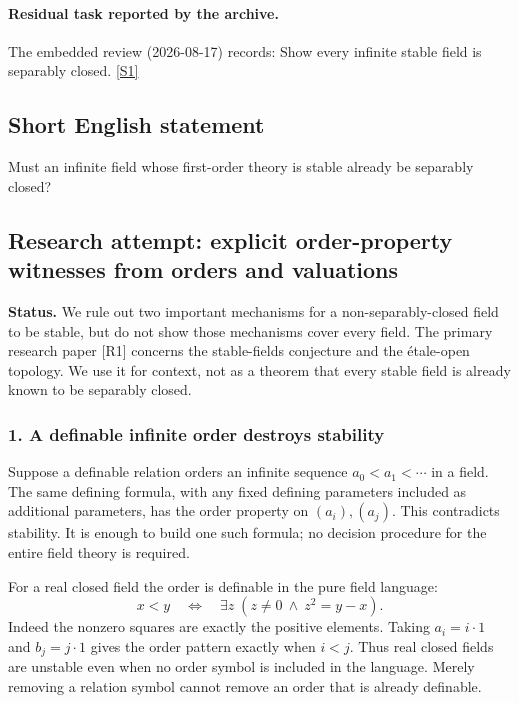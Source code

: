 \documentclass[11pt,a4paper]{article}
\newcommand{\sref}[2]{\hyperlink{source:#1:#2}{[S#2]}}
\begin{document}
\paragraph{Residual task reported by the archive.}

The embedded review (2026-08-17) records: Show every infinite stable field is separably closed. \sref{1463}{1}

\subsection{Short English statement}

Must an infinite field whose first-order theory is stable already be separably closed?

\subsection{Research attempt: explicit order-property witnesses from orders and valuations}
\textbf{Status.} We rule out two important mechanisms for a non-separably-closed field to be stable, but do not show those mechanisms cover every field. The primary research paper [R1] concerns the stable-fields conjecture and the étale-open topology. We use it for context, not as a theorem that every stable field is already known to be separably closed.

\subsubsection{1. A definable infinite order destroys stability}
Suppose a definable relation orders an infinite sequence $a_0<a_1<\cdots$ in a field. The same defining formula, with any fixed defining parameters included as additional parameters, has the order property on $(a_i),(a_j)$. This contradicts stability. It is enough to build one such formula; no decision procedure for the entire field theory is required.

For a real closed field the order is definable in the pure field language:
\[x<y\quad\Longleftrightarrow\quad
\exists z\;(z\ne0\ \wedge\ z^2=y-x).
\]
Indeed the nonzero squares are exactly the positive elements. Taking $a_i=i\cdot1$ and $b_j=j\cdot1$ gives the order pattern exactly when $i<j$. Thus real closed fields are unstable even when no order symbol is included in the language. Merely removing a relation symbol cannot remove an order that is already definable.
\end{document}
